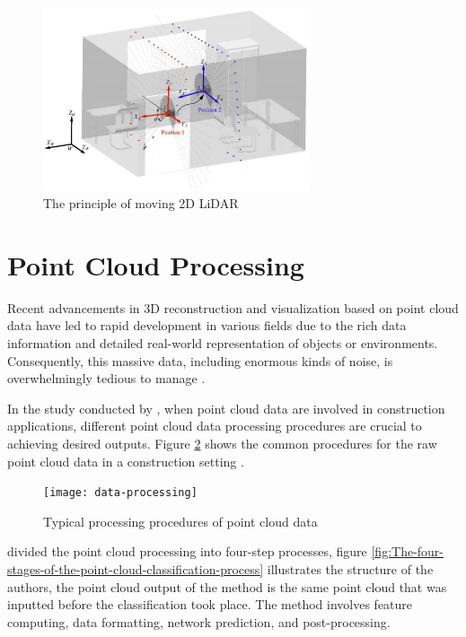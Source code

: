 \begin{figure}[H]
    \centering
    \includegraphics[width=0.7\textwidth]{Figures/moving-2D-LiDAR-principle.jpg}
    \caption{The principle of moving 2D LiDAR}
    \label{fig:The principle of moving 2D LiDAR}
\end{figure}

\section{Point Cloud Processing}
\label{rrl:sec:Point Cloud Processing}
Recent advancements in 3D reconstruction and visualization based on point cloud data have led to rapid development in various fields due to the rich data information and detailed real-world representation of objects or environments. Consequently, this massive data, including enormous kinds of noise, is overwhelmingly tedious to manage \citep{li2020}.

In the study conducted by \citet{wang2020}, when point cloud data are involved in construction applications, different point cloud data processing procedures are crucial to achieving desired outputs. Figure \ref{fig:data-processing} shows the common procedures for the raw point cloud data in a construction setting \citep{wang2020}.

\begin{figure}[H]
    \centering
    \texttt{[image: data-processing]}
    \caption{Typical processing procedures of point cloud data}
    \label{fig:data-processing}
\end{figure}

\citet{stanislas2021} divided the point cloud processing into four-step processes, figure \ref{fig:The-four-stages-of-the-point-cloud-classification-process} illustrates the structure of the authors, the point cloud output of the method is the same point cloud that was inputted before the classification took place. The method involves feature computing, data formatting, network prediction, and post-processing.

